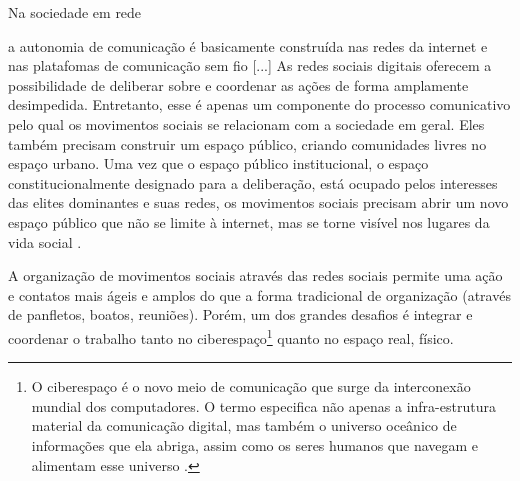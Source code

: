 Na sociedade em rede

\begin{citacao}
a autonomia de comunicação é basicamente construída nas redes da internet e nas platafomas de comunicação sem fio [...]  As redes sociais digitais oferecem a possibilidade de deliberar sobre e coordenar as ações de forma amplamente desimpedida. Entretanto, esse é apenas um componente do processo comunicativo pelo qual os movimentos sociais se relacionam com a sociedade em geral. Eles também precisam construir um espaço público, criando comunidades livres no espaço urbano. Uma vez que o espaço público institucional, o espaço constitucionalmente designado para a deliberação, está ocupado pelos interesses das elites dominantes e suas redes, os movimentos sociais precisam abrir um novo espaço público que não se limite à internet, mas se torne visível nos lugares da vida social \cite[p .18-19]{castells2013}.
\end{citacao}

A organização de movimentos sociais através das redes sociais permite uma ação e contatos mais ágeis e amplos do que a forma tradicional de organização (através de panfletos, boatos, reuniões). Porém, um dos grandes desafios é integrar e coordenar o trabalho tanto no ciberespaço\footnote{O ciberespaço é o novo meio de comunicação que surge da interconexão mundial dos computadores. O termo especifica não apenas a infra-estrutura material da comunicação digital, mas também o universo oceânico de informações que ela abriga, assim como os seres humanos que navegam e alimentam esse universo \cite[p. 17]{levy}.} quanto no espaço real, físico.



